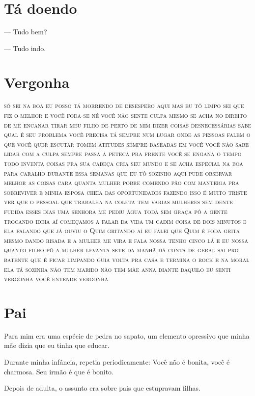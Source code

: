 {{\chapter{Tá doendo}\label{tuxe1-doendo}

--- Tudo bem?

--- Tudo indo.


\chapter{Vergonha}\label{vergonha}

\textsc{só sei na boa eu posso tá morrendo de desespero aqui mas eu tô
limpo sei que fiz o melhor e você foda-se né você não sente culpa
mesmo se acha no direito de me encanar tirar meu filho de perto de mim
dizer coisas desnecessárias sabe qual é seu problema você precisa tá
sempre num lugar onde as pessoas falem o que você quer escutar tomem
atitudes sempre baseadas em você você não sabe lidar com a culpa sempre
passa a peteca pra frente você se engana o tempo todo inventa coisas pra
sua cabeça cria seu mundo e se acha especial na boa para caralho durante
essa semanas que eu tô sozinho aqui pude observar melhor as coisas cara
quanta mulher pobre comendo pão com manteiga pra sobreviver e minha
esposa cheia das oportunidades fazendo isso é muito triste ver que o
pessoal que trabalha na coleta tem varias mulheres sem dente fudida
esses dias uma senhora me pediu água toda sem graça pô a gente trocando
ideia aí começamos a falar da vida um cadim coisa de dois minutos e ela
falando que já ouviu o Quim gritando aí eu falei que Quim é foda grita
mesmo dando risada e a mulher me vira e fala nossa tenho cinco lá e eu
nossa quanto filho pô a mulher levanta sete da manhã dá conta de geral
sai pro batente que é ficar limpando guia volta pra casa e termina o
rock e na moral ela tá sozinha não tem marido não tem mãe anna diante
daquilo eu senti vergonha você entende vergonha }

\chapter{Pai}

Para mim era uma espécie de pedra no sapato, um elemento opressivo que
minha mãe dizia que eu tinha que educar.

Durante minha infância, repetia periodicamente: Você não é bonita, você
é charmosa. Seu irmão é que é bonito.

Depois de adulta, o assunto era sobre pais que estupravam filhas.

}}
